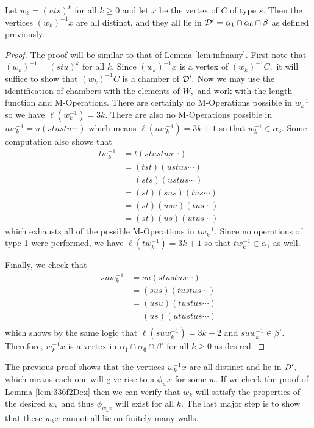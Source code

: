 \documentclass[class=book, crop=false]{standalone}
\begin{document}
\begin{lemma}
	\label{lem:336f2inf}
	Let $w_k=(uts)^k$ for all $k\ge 0$ and let $x$ be the vertex of $C$ of type $s.$ Then the vertices $(w_k)^{-1}x$ are all distinct, and they all lie in $\mathcal{D}'=\alpha_1\cap \alpha_6\cap\beta$ as defined previously.
\end{lemma}
\begin{proof}
	The proof will be similar to that of Lemma \ref{lem:infmany}. First note that $(w_k)^{-1}=(stu)^k$ for all $k.$ Since $(w_k)^{-1}x$ is a vertex of $(w_k)^{-1}C,$ it will suffice to show that $(w_k)^{-1}C$ is a chamber of $\mathcal{D}'.$ Now we may use the identification of chambers with the elements of $W,$ and work with the length function and M-Operations. There are certainly no M-Operations possible in $w_k^{-1}$ so we have $\ell(w_k^{-1})=3k.$ There are also no M-Operations possible in $uw_k^{-1}=u(stustu\cdots)$ which means $\ell(uw_k^{-1})=3k+1$ so that $w_k^{-1}\in \alpha_6.$ Some computation also shows that
	\begin{align*}
		tw_k^{-1}&=t(stustus\cdots)\\
			 &=(tst)(ustus\cdots)\\
			 &=(sts)(ustus\cdots)\\
			 &=(st)(sus)(tus\cdots)\\
			 &=(st)(usu)(tus\cdots)\\
			 &=(st)(us)(utus\cdots)
	\end{align*}
	which exhausts all of the possible M-Operations in $tw_k^{-1}.$ Since no operations of type 1 were performed, we have $\ell(tw_k^{-1})=3k+1$ so that $tw_k^{-1}\in \alpha_1$ as well.

	Finally, we check that
	\begin{align*}
		suw_k^{-1}&=su(stustus\cdots)\\
			  &=(sus)(tustus\cdots)\\
			  &=(usu)(tustus\cdots)\\
			  &=(us)(utustus\cdots)\\
	\end{align*}
	which shows by the same logic that $\ell(suw_k^{-1})=3k+2$ and $suw_k^{-1}\in \beta'.$ Therefore, $w_k^{-1}x$ is a vertex in $\alpha_1\cap \alpha_6\cap \beta'$ for all $k\ge 0$ as desired.
\end{proof}

The previous proof shows that the vertices $w_k^{-1}x$ are all distinct and lie in $\mathcal{D}',$ which means each one will give rise to a $\tilde{\phi}_wx$ for some $w.$ If we check the proof of Lemma \ref{lem:336f2Dex} then we can verify that $w_k$ will satisfy the properties of the desired $w,$ and thus $\tilde{\phi}_{w_kx}$ will exist for all $k.$ The last major step is to show that these $w_kx$ cannot all lie on finitely many walls.
\end{document}
